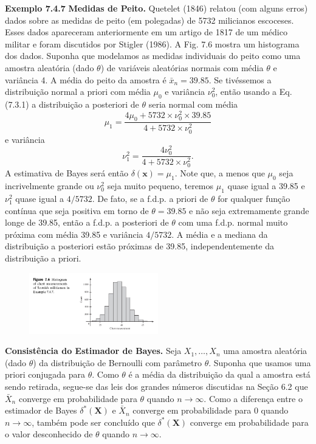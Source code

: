 \vspace{1cm}
\noindent\textbf{Exemplo 7.4.7} \quad \textbf{Medidas de Peito.} Quetelet (1846) relatou (com alguns erros) dados sobre as medidas de peito (em polegadas) de 5732 milicianos escoceses. Esses dados apareceram anteriormente em um artigo de 1817 de um médico militar e foram discutidos por Stigler (1986). A Fig. 7.6 mostra um histograma dos dados. Suponha que modelamos as medidas individuais do peito como uma amostra aleatória (dado $\theta$) de variáveis aleatórias normais com média $\theta$ e variância 4. A média do peito da amostra é $\bar{x}_n = 39.85$. Se tivéssemos a distribuição normal a priori com média $\mu_0$ e variância $\nu_0^2$, então usando a Eq. (7.3.1) a distribuição a posteriori de $\theta$ seria normal com média
$$ \mu_1 = \frac{4\mu_0+5732 \times \nu_0^2 \times 39.85}{4+5732 \times \nu_0^2} $$
e variância
$$ \nu_1^2 = \frac{4\nu_0^2}{4+5732 \times \nu_0^2}. $$
A estimativa de Bayes será então $\delta(\mathbf{x})=\mu_1$. Note que, a menos que $\mu_0$ seja incrivelmente grande ou $\nu_0^2$ seja muito pequeno, teremos $\mu_1$ quase igual a 39.85 e $\nu_1^2$ quase igual a $4/5732$. De fato, se a f.d.p. a priori de $\theta$ for qualquer função contínua que seja positiva em torno de $\theta=39.85$ e não seja extremamente grande longe de 39.85, então a f.d.p. a posteriori de $\theta$ com uma f.d.p. normal muito próxima com média 39.85 e variância $4/5732$. A média e a mediana da distribuição a posteriori estão próximas de 39.85, independentemente da distribuição a priori.

\vspace{1cm}
\begin{figure}[H]

\centering

\includegraphics[width=0.5\textwidth]{img/7_4/img_1.png}

\end{figure}
\vspace{1cm}

\noindent\textbf{Consistência do Estimador de Bayes.} Seja $X_1, \dots, X_n$ uma amostra aleatória (dado $\theta$) da distribuição de Bernoulli com parâmetro $\theta$. Suponha que usamos uma priori conjugada para $\theta$. Como $\theta$ é a média da distribuição da qual a amostra está sendo retirada, segue-se das leis dos grandes números discutidas na Seção 6.2 que $\bar{X}_n$ converge em probabilidade para $\theta$ quando $n \to \infty$. Como a diferença entre o estimador de Bayes $\delta^*(\mathbf{X})$ e $\bar{X}_n$ converge em probabilidade para 0 quando $n \to \infty$, também pode ser concluído que $\delta^*(\mathbf{X})$ converge em probabilidade para o valor desconhecido de $\theta$ quando $n \to \infty$.

